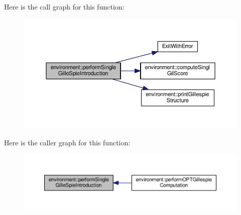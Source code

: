 Here is the call graph for this function\-:\nopagebreak
\begin{figure}[H]
\begin{center}
\leavevmode
\includegraphics[width=350pt]{a00003_a30a0827eed2860d03d5fa5318fcf86b0_cgraph}
\end{center}
\end{figure}




Here is the caller graph for this function\-:\nopagebreak
\begin{figure}[H]
\begin{center}
\leavevmode
\includegraphics[width=350pt]{a00003_a30a0827eed2860d03d5fa5318fcf86b0_icgraph}
\end{center}
\end{figure}


